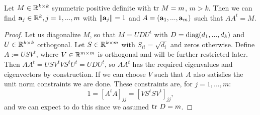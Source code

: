 \documentclass{amsart}
\numberwithin{equation}{section}
\begin{document}
\begin{lemma}\label{lemma:free}
  Let $M \in \mathbb{R}^{k \times k}$ symmetric positive definite with $\textup{tr}\  M =
  m$, $m > k$. Then we can find $\mathbf{a}_j \in \mathbb{R}^k,j=1,...,m$ with
  $\|\mathbf{a}_j\|=1$ and $A = (\mathbf{a}_1,...,\mathbf{a}_m)$ such that $AA^t =
  M$.
\end{lemma}
\begin{proof}
  Let us diagonalize $M$, so that $M = U D U^t$ with $D =
  \textup{diag}(d_1,...,d_k)$ and $U \in \mathbb{R}^{k \times k }$ orthogonal. Let $S
  \in \mathbb{R}^{k \times m}$ with $S_{ii} = \sqrt{d_{i}}$ and zeros
  otherwise. Define $A:= U S V^t$, where $V \in \mathbb{R}^{m \times m}$ is
  orthogonal and will be further restricted later. Then $AA^t = U
  SV^tVS^t U^t = UDU^t$, so $AA^t$ has the required eigenvalues and
  eigenvectors by construction. If we can choose $V$ such that $A$
  also satisfies the unit norm constraints we are done. These
  constraints are, for $j=1,...,m$:
  \begin{equation}\label{eq:V constraints}
   1 = [A^tA]_{jj} = [V S^tS V^t]_{jj},
  \end{equation}
  and we can expect to do this since we assumed $\textup{tr}\  D = m$.


\end{proof}
\end{document}
